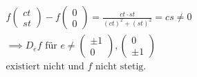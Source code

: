 \begin{bsp*}
\begin{gather*}
		f\begin{pmatrix} ct \\ st \end{pmatrix} - f\begin{pmatrix} 0 \\ 0 \end{pmatrix} = \frac{ct \cdot st}{(ct)^2 + (st)^2} = cs \neq 0 \\
		\implies D_e f \text{ für } e \neq \begin{pmatrix} \pm 1 \\ 0 \end{pmatrix} , \begin{pmatrix} 0 \\ \pm 1 \end{pmatrix} \\
		\text{existiert nicht und $f$ nicht stetig.}
	\end{gather*}
\end{bsp*}
